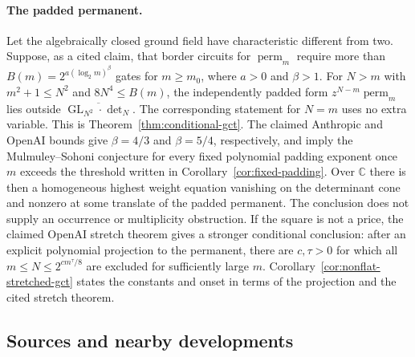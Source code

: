\documentclass[11pt,a4paper]{article}
\newcommand{\C}{\mathbb C}
\newcommand{\GL}{\operatorname{GL}}
\newcommand{\perm}{\operatorname{perm}}
\theoremstyle{definition}
\theoremstyle{remark}
\begin{document}
\paragraph{The padded permanent.}
Let the algebraically closed ground field have characteristic
different from two. Suppose, as a cited claim, that border
circuits for $\perm_m$ require more than
$B(m)=2^{a(\log_2m)^\beta}$ gates for $m\geq m_0$, where
$a>0$ and $\beta>1$.
For $N>m$ with $m^2+1\leq N^2$ and $8N^4\leq B(m)$,
the independently padded form
$z^{N-m}\perm_m$ lies outside
$\overline{\GL_{N^2}\cdot\det_N}$.
The corresponding statement for $N=m$ uses no extra variable.
This is Theorem~\ref{thm:conditional-gct}.
The claimed Anthropic and OpenAI bounds give $\beta=4/3$
and $\beta=5/4$, respectively, and imply the
Mulmuley--Sohoni conjecture for every fixed polynomial padding
exponent once $m$ exceeds the threshold written in
Corollary~\ref{cor:fixed-padding}.
Over $\C$ there is then a homogeneous highest weight equation
vanishing on the determinant cone and nonzero at some translate
of the padded permanent. The conclusion does not supply an
occurrence or multiplicity obstruction.
If the square is not a price, the claimed OpenAI stretch theorem
gives a stronger conditional conclusion: after an explicit
polynomial projection to the permanent, there are $c,\tau>0$
for which all $m\leq N\leq2^{c m^\tau/8}$ are excluded for
sufficiently large $m$.
Corollary~\ref{cor:nonflat-stretched-gct} states the constants
and onset in terms of the projection and the cited stretch theorem.

\subsection{Sources and nearby developments}
\end{document}
